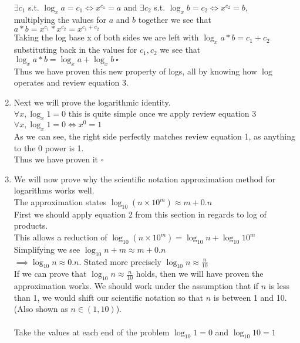 \documentclass[11pt]{article}
\begin{document}
\begin{enumerate}
        $\exists c_1$ s.t. $\log_{x}{a} = c_1 \iff x^{c_1} = a$ and $\exists c_2$ s.t. $\log_{x}{b} = c_2 \iff x^{c_2} = b$, \\ multiplying the values for $a$ and $b$ together we see that $a*b = x^{c_1} * x^{c_2} = x^{c_1+c_2}$ \\
        Taking the log base x of both sides we are left with 
        $\log_{x}{a*b} = c_1 + c_2$ \\ substituting back in the values for $c_1, c_2$ we see that $\log_{x}{a*b} = \log_{x}{a} + \log_{x}{b} \ \square$ \\
        Thus we have proven this new property of logs, all by knowing how $\log$ operates and review equation 3.
    \item Next we will prove the logarithmic identity. \\
        $\forall x, \log_{x}{1} = 0$ this is quite simple once we apply review equation 3 \\
        $\forall x, \log_{x}{1} = 0 \iff x^{0} = 1$ \\
        As we can see, the right side perfectly matches review equation 1, as anything to the 0 power is 1. \\ 
        Thus we have proven it $\square$
    \item We will now prove why the scientific notation approximation method for logarithms works well. \\
        The approximation states $\log_{10}{(n \times 10^{m})} \approx m + 0.n$ \\
        First we should apply equation 2 from this section in regards to log of products. \\
        This allows a reduction of $\log_{10}{(n \times 10^{m})} = \log_{10}{n} + \log_{10}{10^m}$ \\
        Simplifying we see $\log_{10}{n} + m \approx m + 0.n$ \\
        $\implies \log_{10}{n} \approx 0.n$. Stated more precisely $\log_{10}{n} \approx \frac{n}{10}$\\
        If we can prove that $\log_{10}{n} \approx \frac{n}{10}$ holds, then we will have proven the approximation works. We should work under the assumption that if $n$ is less than 1, we would shift our scientific notation so that $n$ is between 1 and 10. (Also shown as $n \in (1,10)$). \\ \\
        Take the values at each end of the problem $\log_{10}{1} = 0$ and $\log_{10}{10} = 1$
\end{enumerate}
\end{document}
